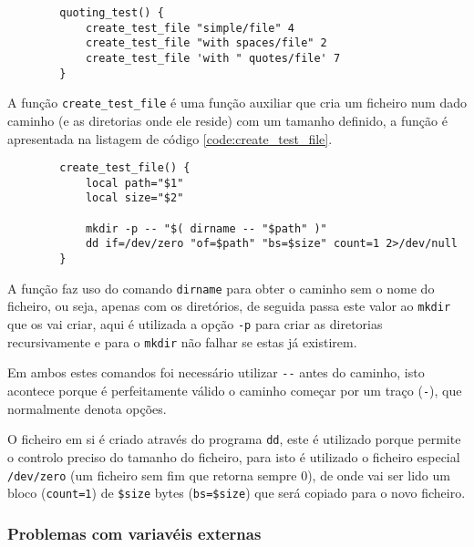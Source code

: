 \begin{listing}[H]
	\centering
	\begin{verbatim}
		quoting_test() {
			create_test_file "simple/file" 4
			create_test_file "with spaces/file" 2
			create_test_file 'with " quotes/file' 7
		}
	\end{verbatim}
	\cprotect\caption{Exemplo da definição de um teste do \Verb|spacecheck.sh|.}
	\label{code:test_definition}
\end{listing}

A função \Verb|create_test_file| é uma função auxiliar que cria um ficheiro num
dado caminho (e as diretorias onde ele reside) com um tamanho definido, a função
é apresentada na listagem de código \ref{code:create_test_file}.

\begin{listing}[H]
	\centering
	\begin{verbatim}
		create_test_file() {
			local path="$1"
			local size="$2"

			mkdir -p -- "$( dirname -- "$path" )"
			dd if=/dev/zero "of=$path" "bs=$size" count=1 2>/dev/null
		}
	\end{verbatim}
	\cprotect\caption{Definição da função \Verb|create_test_file|.}
	\label{code:create_test_file}
\end{listing}

A função faz uso do comando \Verb|dirname| para obter o caminho sem o nome do
ficheiro, ou seja, apenas com os diretórios, de seguida passa este valor ao
\Verb|mkdir| que os vai criar, aqui é utilizada a opção \Verb|-p| para criar as
diretorias recursivamente e para o \Verb|mkdir| não falhar se estas já existirem.

Em ambos estes comandos foi necessário utilizar \Verb|--| antes do caminho, isto
acontece porque é perfeitamente válido o caminho começar por um traço
(\Verb|-|), que normalmente denota opções.

O ficheiro em si é criado através do programa \Verb|dd|, este é utilizado porque
permite o controlo preciso do tamanho do ficheiro, para isto é utilizado o
ficheiro especial \Verb|/dev/zero| (um ficheiro sem fim que retorna sempre 0),
de onde vai ser lido um bloco (\Verb|count=1|) de \Verb|$size| bytes
	(\Verb|bs=$size|) que será copiado para o novo ficheiro.

\subsubsection{Problemas com variavéis externas}

